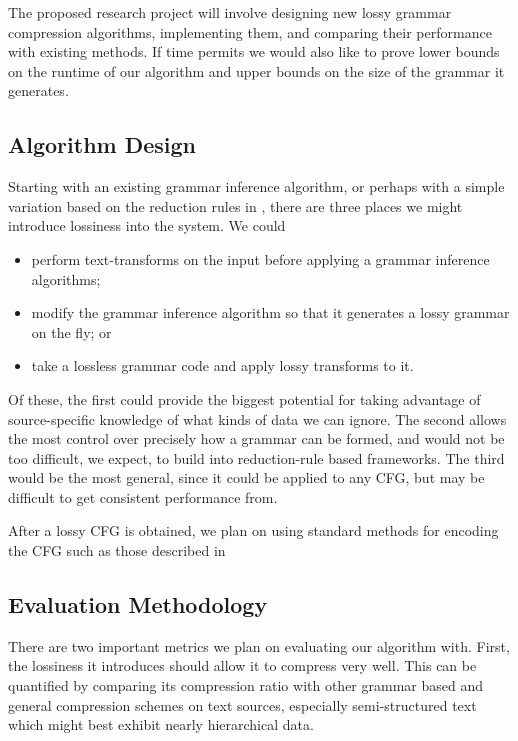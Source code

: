\documentclass[11pt]{article}
\begin{document}
The proposed research project will involve designing new lossy grammar
compression algorithms, implementing them, and comparing their performance with
existing methods.  If time permits we would also like to prove lower bounds on
the runtime of our algorithm and upper bounds on the size of the grammar it
generates.

\subsection{Algorithm Design}

Starting with an existing grammar inference algorithm, or perhaps with a simple
variation based on the reduction rules in \cite{grammarcodes}, there are three
places we might introduce lossiness into the system.  We could
\begin{itemize}
  \item perform text-transforms on the input before applying a grammar
    inference algorithms;
  \item modify the grammar inference algorithm so that it generates a lossy
    grammar on the fly; or
  \item take a lossless grammar code and apply lossy transforms to it.
\end{itemize}
Of these, the first could provide the biggest potential for taking advantage of
source-specific knowledge of what kinds of data we can ignore.  The second
allows the most control over precisely how a grammar can be formed, and would
not be too difficult, we expect, to build into reduction-rule based frameworks.
The third would be the most general, since it could be applied to any CFG, but
may be difficult to get consistent performance from.

After a lossy CFG is obtained, we plan on using standard methods for encoding
the CFG such as those described in \cite{sequitur2}

\subsection{Evaluation Methodology}

There are two important metrics we plan on evaluating our algorithm with.
First, the lossiness it introduces should allow it to compress very well. This
can be quantified by comparing its compression ratio with other grammar based
and general compression schemes on text sources, especially semi-structured
text which might best exhibit nearly hierarchical data.
\end{document}
